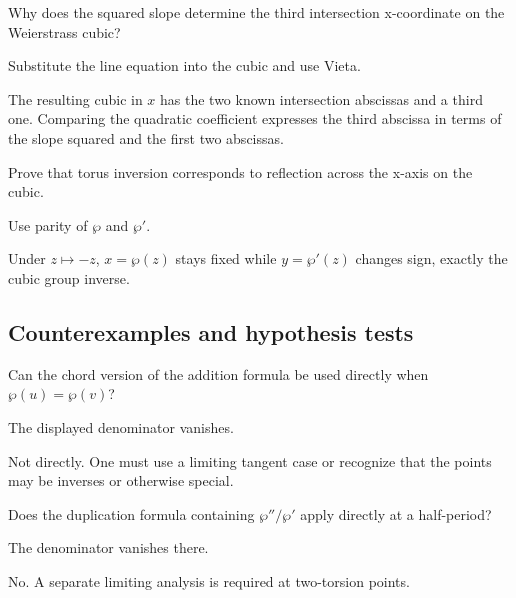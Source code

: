 \begin{exercise}\label{exr:iv30-expand-08}
Why does the squared slope determine the third intersection x-coordinate on the Weierstrass cubic?
\end{exercise}
\begin{hint}
Substitute the line equation into the cubic and use Vieta.
\end{hint}
\begin{solution}
The resulting cubic in \(x\) has the two known intersection abscissas and a third one. Comparing the quadratic coefficient expresses the third abscissa in terms of the slope squared and the first two abscissas.
\end{solution}

\begin{exercise}\label{exr:iv30-expand-09}
Prove that torus inversion corresponds to reflection across the x-axis on the cubic.
\end{exercise}
\begin{hint}
Use parity of \(\wp\) and \(\wp'\).
\end{hint}
\begin{solution}
Under \(z\mapsto-z\), \(x=\wp(z)\) stays fixed while \(y=\wp'(z)\) changes sign, exactly the cubic group inverse.
\end{solution}

\subsection*{Counterexamples and hypothesis tests}

\begin{exercise}\label{exr:iv30-expand-10}
Can the chord version of the addition formula be used directly when \(\wp(u)=\wp(v)\)?
\end{exercise}
\begin{hint}
The displayed denominator vanishes.
\end{hint}
\begin{solution}
Not directly. One must use a limiting tangent case or recognize that the points may be inverses or otherwise special.
\end{solution}

\begin{exercise}\label{exr:iv30-expand-11}
Does the duplication formula containing \(\wp''/\wp'\) apply directly at a half-period?
\end{exercise}
\begin{hint}
The denominator vanishes there.
\end{hint}
\begin{solution}
No. A separate limiting analysis is required at two-torsion points.
\end{solution}

